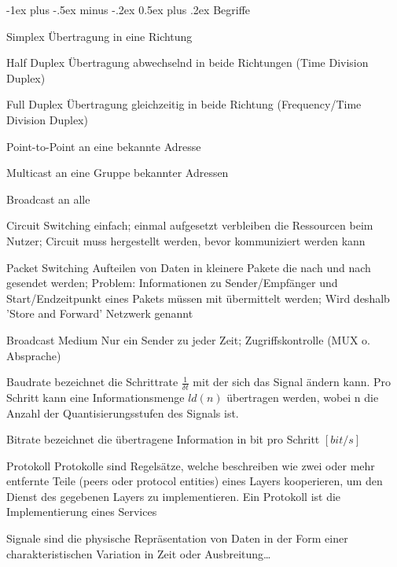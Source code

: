\documentclass[10pt,landscape]{article}
\makeatletter
\renewcommand{\section}{\@startsection{section}{1}{0mm}%
                                {-1ex plus -.5ex minus -.2ex}%
                                {0.5ex plus .2ex}%
                                {\normalfont\large\bfseries}}
\makeatother
\begin{document}
\begin{multicols}{3}
    \newpage
    \section{Begriffe}
    \begin{description*}
        \item[Simplex] Übertragung in eine Richtung
        \item[Half Duplex] Übertragung abwechselnd in beide Richtungen (Time Division Duplex)
        \item[Full Duplex] Übertragung gleichzeitig in beide Richtung (Frequency/Time Division Duplex)
        \item[Point-to-Point] an eine bekannte Adresse
        \item[Multicast] an eine Gruppe bekannter Adressen
        \item[Broadcast] an alle
        \item[Circuit Switching] einfach; einmal aufgesetzt verbleiben die Ressourcen beim Nutzer; Circuit muss hergestellt werden, bevor kommuniziert werden kann
        \item[Packet Switching] Aufteilen von Daten in kleinere Pakete die nach und nach gesendet werden; Problem: Informationen zu Sender/Empfänger und Start/Endzeitpunkt eines Pakets müssen mit übermittelt werden; Wird deshalb 'Store and Forward' Netzwerk genannt
        \item[Broadcast Medium] Nur ein Sender zu jeder Zeit; Zugriffskontrolle (MUX o. Absprache)
        \item[Baudrate] bezeichnet die Schrittrate $\frac{1}{\delta t}$ mit der sich das Signal ändern kann. Pro Schritt kann eine Informationsmenge $ld(n)$ übertragen werden, wobei n die Anzahl der
        Quantisierungsstufen des Signals ist. %
        \item[Bitrate] bezeichnet die übertragene Information in bit pro Schritt $[bit/s]$
        \item[Protokoll] Protokolle sind Regelsätze, welche beschreiben wie zwei oder mehr entfernte Teile (peers oder protocol entities) eines Layers kooperieren, um den Dienst des gegebenen Layers zu implementieren. Ein Protokoll ist die Implementierung eines Services
        \item[Signale] sind die physische Repräsentation von Daten in der Form einer charakteristischen Variation in Zeit oder Ausbreitung…

\end{description*}
\end{multicols}
\end{document}
